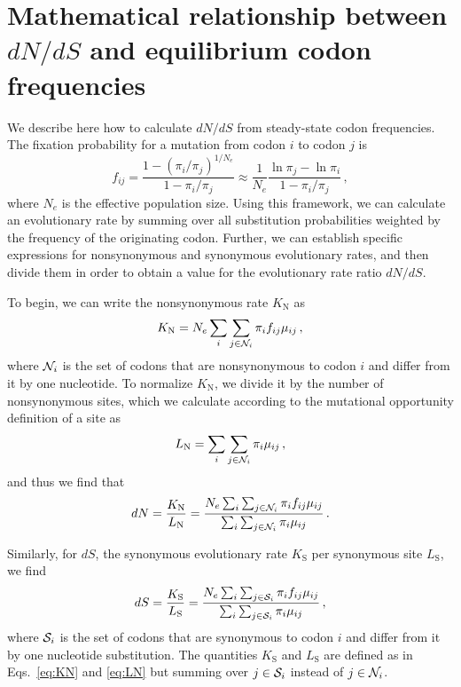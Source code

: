 \documentclass[11pt]{article}
\begin{document}
\section*{Mathematical relationship between $dN/dS$ and equilibrium codon frequencies}


We describe here how to calculate $dN/dS$ from steady-state codon frequencies. The fixation probability for a mutation from codon $i$ to codon $j$ is \cite{HalpernBruno1998,SellaHirsh2005}
\begin{equation}\label{eq:f_ij}
 f_{ij} = \frac{1-(\pi_i/\pi_j)^{1/N_e}}{1-\pi_i/\pi_j}
  \approx \frac{1}{N_e} \frac{\ln \pi_j - \ln \pi_i}{1-\pi_i/\pi_j}\,,
\end{equation}
where $N_e$ is the effective population size. Using this framework, we can calculate an evolutionary rate by summing over all substitution probabilities weighted by the frequency of the originating codon. Further, we can establish specific expressions for nonsynonymous and synonymous evolutionary rates, and then divide them in order to obtain a value for the evolutionary rate ratio $dN/dS$.

To begin, we can write the nonsynonymous rate $K_\text{N}$ as 
\begin{equation}\label{eq:KN}
  K_\text{N} = N_e \sum_i \sum_{j \in {\cal N}_i} \pi_i  f_{ij}\mu_{ij}\,,
\end{equation}
where ${\cal N}_i$ is the set of codons that are nonsynonymous to codon $i$ and differ from it by one nucleotide. To normalize $K_\text{N}$, we divide it by the number of nonsynonymous sites, which we calculate according to the mutational opportunity definition of a site \cite{GoldmanYang1994, Yang2006} as 
\begin{equation}\label{eq:LN}
  L_\text{N} = \sum_i \sum_{j \in {\cal N}_i} \pi_i \mu_{ij}\,, 
\end{equation} and thus we find that 
\begin{equation}\label{eq:dN}
  dN = \frac{K_\text{N}}{L_\text{N}}=\frac{ N_e \sum_i \sum_{j \in {\cal N}_i} \pi_i f_{ij} \mu_{ij} } {\sum_i \sum_{j \in {\cal N}_i} \pi_i \mu_{ij} }\,.
\end{equation}

Similarly, for $dS$, the synonymous evolutionary rate $K_\text{S}$ per synonymous site $L_\text{S}$, we find
\begin{equation}\label{eq:dS}
  dS = \frac{K_\text{S}}{L_\text{S}}=\frac{ N_e \sum_i \sum_{j \in {\cal S}_i} \pi_i f_{ij} \mu_{ij} } {\sum_i \sum_{j \in {\cal S}_i} \pi_i \mu_{ij} }\,,
\end{equation}
where ${\cal S}_i$ is the set of codons that are synonymous to codon $i$ and differ from it by one nucleotide substitution. The quantities $K_\text{S}$ and $L_\text{S}$ are defined as in Eqs.~\eqref{eq:KN} and \eqref{eq:LN} but summing over $j\in {\cal S}_i$ instead of $j\in {\cal N}_i$.
\end{document}
